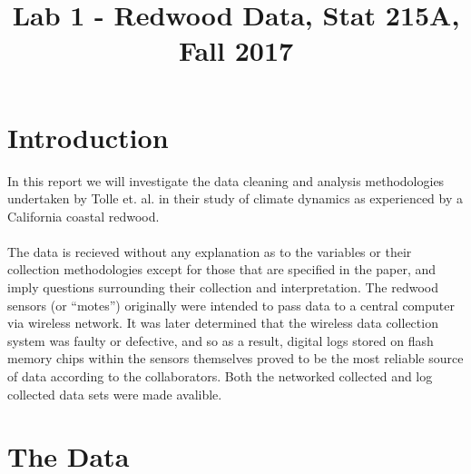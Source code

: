 \documentclass[english]{article}\usepackage[]{graphicx}\usepackage[]{color}
\begin{document}
\title{Lab 1 - Redwood Data, Stat 215A, Fall 2017}

\maketitle





\section{Introduction}

In this report we will investigate the data cleaning and analysis methodologies undertaken by Tolle et. al. in their study of climate dynamics as experienced by a California coastal redwood.\\\\
The data is recieved without any explanation as to the variables or their collection
methodologies except for those that are specified in the paper, and
imply questions surrounding their collection and interpretation.  The redwood sensors (or ``motes'')
originally were intended to pass data to a central computer via wireless network.  It was
later determined that the wireless data collection system was faulty or defective, and
so as a result, digital logs stored on flash memory chips within the sensors themselves 
proved to be the most reliable source of data according to the collaborators.  Both the 
networked collected and log collected data sets were made avalible.

\section{The Data}
\end{document}
